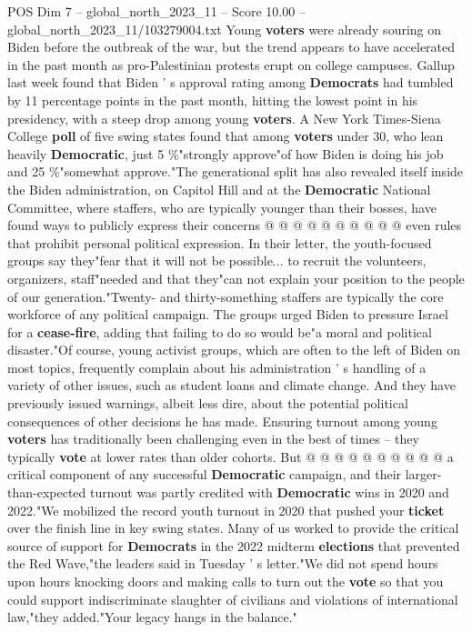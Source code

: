 \begin{textsample}{POS Dim 7 – global\_north\_2023\_11 – Score 10.00 – global\_north\_2023\_11/103279004.txt}
Young \textbf{voters} were already souring on Biden before the outbreak of the war, but the trend appears to have accelerated in the past month as pro-Palestinian protests erupt on college campuses.
Gallup last week found that Biden ' s approval rating among \textbf{Democrats} had tumbled by 11 percentage points in the past month, hitting the lowest point in his presidency, with a steep drop among young \textbf{voters}.
A New York Times-Siena College \textbf{poll} of five swing states found that among \textbf{voters} under 30, who lean heavily \textbf{Democratic}, just 5 \%"strongly approve"of how Biden is doing his job and 25 \%"somewhat approve."The generational split has also revealed itself inside the Biden administration, on Capitol Hill and at the \textbf{Democratic} National Committee, where staffers, who are typically younger than their bosses, have found ways to publicly express their concerns @ @ @ @ @ @ @ @ @ @ even rules that prohibit personal political expression.
In their letter, the youth-focused groups say they"fear that it will not be possible... to recruit the volunteers, organizers, staff"needed and that they"can not explain your position to the people of our generation."Twenty- and thirty-something staffers are typically the core workforce of any political campaign.
The groups urged Biden to pressure Israel for a \textbf{cease-fire}, adding that failing to do so would be"a moral and political disaster."Of course, young activist groups, which are often to the left of Biden on most topics, frequently complain about his administration ' s handling of a variety of other issues, such as student loans and climate change.
And they have previously issued warnings, albeit less dire, about the potential political consequences of other decisions he has made.
Ensuring turnout among young \textbf{voters} has traditionally been challenging even in the best of times -- they typically \textbf{vote} at lower rates than older cohorts.
But @ @ @ @ @ @ @ @ @ @ a critical component of any successful \textbf{Democratic} campaign, and their larger-than-expected turnout was partly credited with \textbf{Democratic} wins in 2020 and 2022."We mobilized the record youth turnout in 2020 that pushed your \textbf{ticket} over the finish line in key swing states.
Many of us worked to provide the critical source of support for \textbf{Democrats} in the 2022 midterm \textbf{elections} that prevented the Red Wave,"the leaders said in Tuesday ' s letter."We did not spend hours upon hours knocking doors and making calls to turn out the \textbf{vote} so that you could support indiscriminate slaughter of civilians and violations of international law,"they added."Your legacy hangs in the balance."

\end{textsample}

